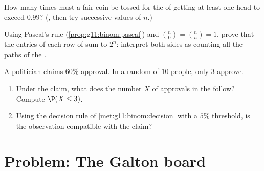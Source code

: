 \begin{exercise}[$\star\star$]\label{exo:g11:binom:9}
How many times must a fair coin be tossed for the  of getting
at least one head to exceed $0.99$? (, then try successive
values of $n$.)
\end{exercise}

\begin{exercise}[$\star\star$]\label{exo:g11:binom:10}
Using Pascal's rule (\cref{prop:g11:binom:pascal}) and
$\binom n0 = \binom nn = 1$, prove that the entries of each row of
 sum to $2^n$: interpret both sides as counting all the
paths of the .
\end{exercise}

\begin{exercise}[$\star\star\star$]\label{exo:g11:binom:11}
A politician claims $60\%$ approval. In a random  of $10$ people,
only $3$ approve.
\begin{enumerate}
  \item Under the claim, what  does the number $X$ of
        approvals in the  follow? Compute $\P(X \leq 3)$.
  \item Using the decision rule of \cref{met:g11:binom:decision} with a
        $5\%$ threshold, is the observation compatible with the claim?
\end{enumerate}
\end{exercise}

\section{Problem: The Galton board}

